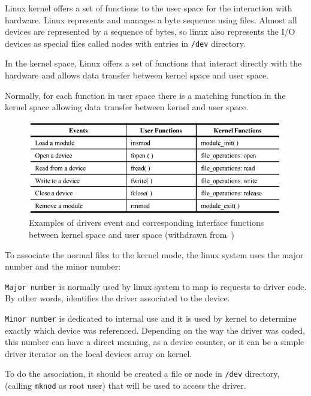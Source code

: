 Linux kernel offers a set of functions to the user space for the interaction with hardware.
Linux represents and manages a byte sequence using files.
Almost all devices are represented by a sequence of bytes, so linux also represents the I/O devices as special files called nodes with entries in \texttt{/dev} directory.

In the kernel space, Linux offers a set of functions that interact directly with the hardware and allows data transfer between kernel space and user space.

Normally, for each function in user space there is a matching function in the kernel space allowing data transfer between kernel and user space.

\begin{figure}[htb!]
\centering
    \includegraphics[width=0.75\columnwidth]{./img/ddrivers-events-ex.png}
  \caption{Examples of drivers event and corresponding interface functions between kernel space and user space (withdrawn from~\cite{ddrivers-slides})}%
\label{fig:ddrivers-events-ex}
\end{figure}

To associate the normal files to the kernel mode, the linux
system uses the major number and the minor number:
\begin{item-c}
\item 
\texttt{Major number} is normally used by linux system to map \gls{io} requests to driver code. 
By other words, identifies the driver associated to the device.
\item
\texttt{Minor number} is dedicated to internal use and it is used by kernel to determine exactly which device was referenced. 
Depending on the way the driver was coded,
this number can have a direct meaning, as a device counter, or it can be a simple driver iterator on the local devices array on kernel.
\end{item-c}

To do the association, it should be created a file or node in \texttt{/dev} directory, (calling \texttt{mknod} as root user) that will be used to access the driver.

